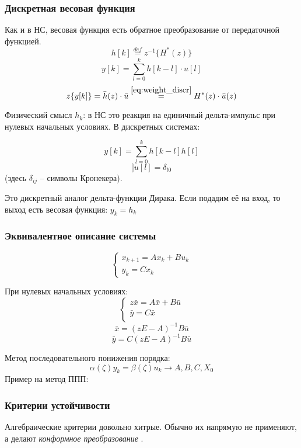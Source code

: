 \documentclass[main.tex]{subfiles}
\begin{document}
\subsubsection{ Дискретная весовая функция }
Как и в НС, весовая функция есть обратное преобразование от передаточной функцией.
\begin{equation}\label{eq:weight_discr}
	h[k] \overset{def}= z^{-1} \{ H^*(z) \}
\end{equation}
\[  \]
\[ y[k] = \sum_{l=0}^{k} h[k-l] \cdot u[l] \]
\[ z\{ y[k] \} = \bar h(z) \cdot \bar u \overset{\ref{eq:weight_discr}}= H^*(z) \cdot \bar u(z) \]

Физический смысл $ h_k $: в НС это реакция на единичный дельта-импульс при нулевых начальных условиях.
В дискретных системах:

\[ y[k] = \sum_{l=0}^{k} h[k-l] h[l] \]
\[ ] u[l] = \delta_{l0} \]
(здесь $ \delta_{ij} $ -- символы Кронекера).


Это дискретный аналог дельта-функции Дирака.
Если подадим её на вход, то выход есть весовая функция: $ \boxed{ y_k = h_k } $


\subsubsection{ Эквивалентное описание системы }

$$ \begin{cases}
x_{k+1} = A x_k + B u_k \\
y_k = C x_k
\end{cases} $$

При нулевых начальных условиях:
$$ \begin{cases}
z \bar x = A \bar x + B \bar u \\
\bar y = C \bar x \\
\end{cases} $$
\[ \bar x = (zE - A)^{-1} B \bar u \]
\[ \bar y = C(zE - A)^{-1} B \bar u \]

Метод последовательного понижения порядка:
\[ \alpha(\zeta) y_k = \beta(\zeta) u_k \to A, B, C, X_0 \]
Пример на метод ППП:
\[ \]

\subsubsection{ Критерии устойчивости }

Алгебраические критерии довольно хитрые.
Обычно их напрямую не применяют, а делают \emph{ конформное преобразование }.
\end{document}
